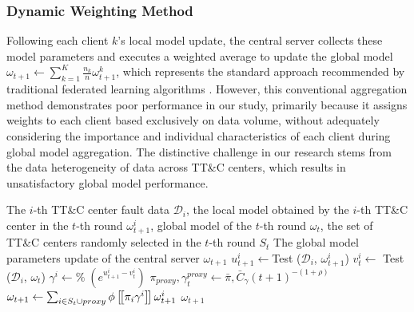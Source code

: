 \subsubsection{Dynamic Weighting Method}
\label{section:3-2-2}
Following each client $k$'s local model update, 
the central server collects these model parameters and 
executes a weighted average to update the global model ${\omega _{t + 1}} \leftarrow \sum\nolimits_{k = 1}^K {\frac{{{n_k}}}{n}\omega _{t + 1}^k} $, 
which represents the standard approach recommended by traditional federated learning algorithms \cite{von2018data}. 
However, this conventional aggregation method demonstrates poor performance in our study, 
primarily because it assigns weights to each client based exclusively on data volume, 
without adequately considering the importance and individual characteristics of each client during global model aggregation. 
The distinctive challenge in our research stems from the data heterogeneity of data across TT\&C centers, 
which results in unsatisfactory global model performance.

\begin{algorithm}[t]
	\caption{Dynamic Weighting Method}
	\label{Alg:Dynamic_Weighting_Method}
	\begin{algorithmic}[1]
		\REQUIRE The $i$-th TT\&C center fault data ${{\mathscr D}_{i}}$, the local model obtained by the $i$-th TT\&C center in the $t$-th round $\omega _{t + 1}^i$, global model of the $t$-th round ${\omega _t}$, the set of TT\&C centers randomly selected in the $t$-th round ${S_t}$
		\ENSURE The global model parameters update of the central server ${\omega _{t + 1}}$
		\STATE $u_{t + 1}^i \leftarrow $Test (${{\mathscr D}_{i}}$, $\omega _{t + 1}^i$)
		\STATE $v_t^i \leftarrow $ Test (${{\mathscr D}_{i}}$, ${\omega _t}$)
		\STATE ${\gamma ^i} \leftarrow \% \; ({{e^{u_{t + 1}^i - v_t^i}}})  $
		\STATE ${\pi _{proxy}},{\gamma _t^{proxy}} \leftarrow \bar \pi ,\bar C_{\gamma}(t+1)^{-(1+\rho )}$
		\STATE ${\omega _{t + 1}} \leftarrow \sum\nolimits_{i \in {S_t} \cup proxy} {\phi \left[\kern-0.15em\left[ {{\pi _i}{\gamma ^i}}  \right]\kern-0.15em\right]\omega _{t + 1}^i} $
		\RETURN ${\omega _{t + 1}}$
	\end{algorithmic}
\end{algorithm}

